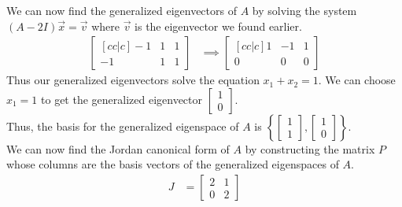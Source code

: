 \documentclass[answers,12pt,addpoints]{exam}
\begin{document}
\begin{questions}
\begin{solution}
        We can now find the generalized eigenvectors of $A$ by solving the system $(A - 2I)\vec{x} = \vec{v}$ where $\vec{v}$ is the eigenvector we found earlier.
        \begin{align*}
            \begin{bmatrix}[cc|c]
                -1 & 1 & 1 \\
                -1 & 1 & 1
            \end{bmatrix}
            &\implies
            \begin{bmatrix}[cc|c]
                1 & -1 & 1 \\
                0 & 0 & 0
            \end{bmatrix}
        \end{align*}
        Thus our generalized eigenvectors solve the equation $x_1 + x_2 =1$. We can choose $x_1 = 1$ to get the generalized eigenvector $\begin{bmatrix} 1\\ 0 \end{bmatrix}$. \\
        Thus, the basis for the generalized eigenspace of $A$ is $\left\{ \begin{bmatrix} 1\\ 1 \end{bmatrix}, \begin{bmatrix} 1\\ 0 \end{bmatrix} \right\}$. \\
        We can now find the Jordan canonical form of $A$ by constructing the matrix $P$ whose columns are the basis vectors of the generalized eigenspaces of $A$.
        \begin{align*}
            J &= \begin{bmatrix}
                2 & 1 \\
                0 & 2
            \end{bmatrix}
        \end{align*}


\end{solution}
\end{questions}
\end{document}
